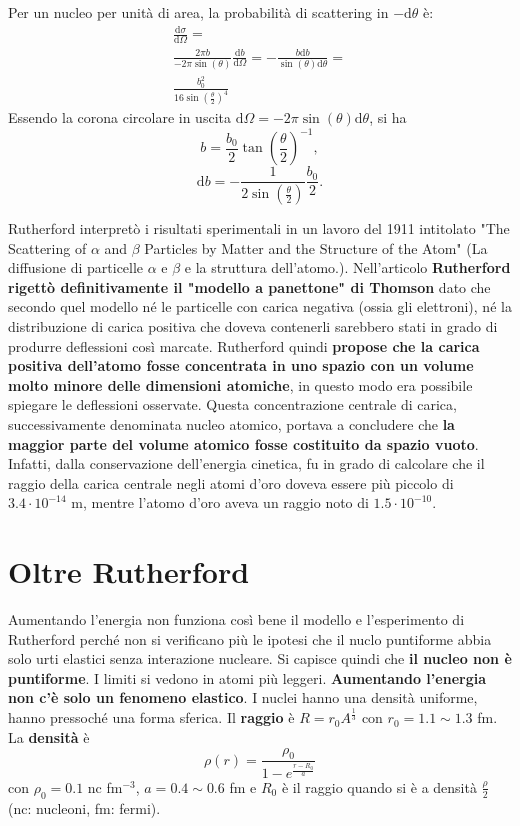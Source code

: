 \documentclass[a4paper,11pt,twoside,openany]{book}
\theoremstyle{definition}
\theoremstyle{plain}
\theoremstyle{plain}
\theoremstyle{definition}
\begin{document}
Per un nucleo per unità di area, la probabilità di scattering in $-\textrm{d}\theta$ è:
\begin{equation}\begin{split}
\frac{\textrm{d}\sigma}{\textrm{d}\Omega}=\\
\frac{2\pi b}{-2\pi \sin{\left(\theta\right)}}\frac{\textrm{d}b}{\textrm{d}\Omega}=-\frac{b\textrm{d}b}{\sin{\left(\theta\right)}\textrm{d}\theta}=\\
\frac{b^2_0}{16\sin{\left(\frac{\theta}{2}\right)}^4}
\end{split}\end{equation}
Essendo la corona circolare in uscita $\textrm{d}\Omega=-2\pi \sin{\left(\theta\right)} \textrm{d}\theta$, si ha $$b=\frac{b_0}{2}\tan{\left(\frac{\theta}{2}\right)}^{-1},$$ $$\textrm{d}b=-\frac{1}{2\sin{\left(\frac{\theta}{2}\right)}}\frac{b_0}{2}.$$

Rutherford interpretò i risultati sperimentali in un lavoro del 1911 intitolato "The Scattering of $\alpha$ and $\beta$ Particles by Matter and the Structure of the Atom" (La diffusione di particelle $\alpha$ e $\beta$ e la struttura dell'atomo.).
Nell'articolo \textbf{Rutherford rigettò definitivamente il "modello a panettone" di Thomson} dato che secondo quel modello né le particelle con carica negativa (ossia gli elettroni), né la distribuzione di carica positiva che doveva contenerli sarebbero stati in grado di produrre deflessioni così marcate.
Rutherford quindi \textbf{propose che la carica positiva dell'atomo fosse concentrata in uno spazio con un volume molto minore delle dimensioni atomiche}, in questo modo era possibile spiegare le deflessioni osservate. Questa concentrazione centrale di carica, successivamente denominata nucleo atomico, portava a concludere che \textbf{la maggior parte del volume atomico fosse costituito da spazio vuoto}. Infatti, dalla conservazione dell'energia cinetica, fu in grado di calcolare che il raggio della carica centrale negli atomi d'oro doveva essere più piccolo di $3.4\cdot 10^{-14}$ m, mentre l'atomo d'oro aveva un raggio noto di $1.5\cdot 10^{-10}$.

\section{Oltre Rutherford} %
Aumentando l'energia non funziona così bene il modello e l'esperimento di Rutherford perché non si verificano più le ipotesi che il nuclo puntiforme abbia solo urti elastici senza interazione nucleare. Si capisce quindi che \textbf{il nucleo non è puntiforme}. I limiti si vedono in atomi più leggeri. \textbf{Aumentando l'energia non c'è solo un fenomeno elastico}. I nuclei hanno una densità uniforme, hanno pressoché una forma sferica. Il \textbf{raggio} è $R=r_0A^{\frac{1}{3}}$ con $r_0=1.1\sim 1.3$ fm. La \textbf{densità} è $$\rho\left(r\right)=\frac{\rho_0}{1-e^{\frac{r-R_0}{a}}}$$ con $\rho_0=0.1$ nc fm$^{-3}$, $a=0.4\sim 0.6$ fm e $R_0$ è il raggio quando si è a densità $\frac{\rho}{2}$ (nc: nucleoni, fm: fermi).
\end{document}
